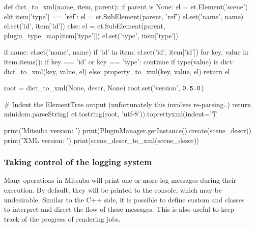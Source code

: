 \begin{python}
    def dict_to_xml(name, item, parent):
        if parent is None:
            el = et.Element('scene')
        elif item['type'] == 'ref':
            el = et.SubElement(parent, 'ref')
            el.set('name', name)
            el.set('id', item['id'])
        else:
            el = et.SubElement(parent, plugin_type_map[item['type']])
            el.set('type', item['type'])

        if name:
            el.set('name', name)
        if 'id' in item:
            el.set('id', item['id'])
        for key, value in item.items():
            if key == 'id' or key == 'type':
                continue
            if type(value) is dict:
                dict_to_xml(key, value, el)
            else:
                property_to_xml(key, value, el)
        return el

    root = dict_to_xml(None, descr, None)
    root.set('version', $\texttt{0.5.0}$)

    # Indent the ElementTree output (unfortunately this involves re-parsing..)
    return minidom.parseString(
        et.tostring(root, 'utf-8')).toprettyxml(indent='\t')

print('Mitsuba version: ')
print(PluginManager.getInstance().create(scene_descr))
print('XML version: ')
print(scene_descr_to_xml(scene_descr))
\end{python}

\subsubsection{Taking control of the logging system}
Many operations in Mitsuba will print one or more log messages
during their execution. By default, they will be printed to the console,
which may be undesirable. Similar to the C++ side, it is possible to define
custom  and  classes to interpret and direct
the flow of these messages. This is also useful to keep track of the progress
of rendering jobs.

